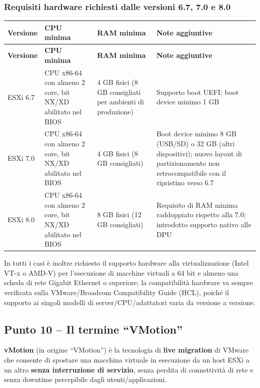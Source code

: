 \documentclass[11pt,a4paper]{article}
\begin{document}
\subsubsection{Requisiti hardware richiesti dalle versioni 6.7, 7.0 e 8.0}

\begin{center}
\begin{longtable}{p{2.4cm}p{3.6cm}p{3.0cm}p{4.6cm}}
\toprule
\textbf{Versione} & \textbf{CPU minima} & \textbf{RAM minima} & \textbf{Note aggiuntive} \\
\midrule
\endfirsthead
\toprule
\textbf{Versione} & \textbf{CPU minima} & \textbf{RAM minima} & \textbf{Note aggiuntive} \\
\midrule
\endhead
ESXi 6.7 & CPU x86-64 con almeno 2 core, bit NX/XD abilitato nel BIOS & 4 GB fisici (8 GB consigliati per ambienti di produzione) & Supporto boot UEFI; boot device minimo 1 GB \\
ESXi 7.0 & CPU x86-64 con almeno 2 core, bit NX/XD abilitato nel BIOS & 4 GB fisici (8 GB consigliati) & Boot device minimo 8 GB (USB/SD) o 32 GB (altri dispositivi); nuovo layout di partizionamento non retrocompatibile con il ripristino verso 6.7 \\
ESXi 8.0 & CPU x86-64 con almeno 2 core, bit NX/XD abilitato nel BIOS & 8 GB fisici (12 GB consigliati) & Requisito di RAM minima raddoppiato rispetto alla 7.0; introdotto supporto nativo alle DPU \\
\bottomrule
\end{longtable}
\end{center}

In tutti i casi è inoltre richiesto il supporto hardware alla virtualizzazione (Intel VT-x o AMD-V) per l'esecuzione di macchine virtuali a 64 bit e almeno una scheda di rete Gigabit Ethernet o superiore; la compatibilità hardware va sempre verificata sulla VMware/Broadcom Compatibility Guide (HCL), poiché il supporto ai singoli modelli di server/CPU/adattatori varia da versione a versione.

\subsection{Punto 10 -- Il termine ``VMotion''}

\textbf{vMotion} (in origine ``VMotion'') è la tecnologia di \textbf{live migration} di VMware che consente di spostare una macchina virtuale in esecuzione da un host ESXi a un altro \textbf{senza interruzione di servizio}, senza perdita di connettività di rete e senza downtime percepibile dagli utenti/applicazioni.
\end{document}

